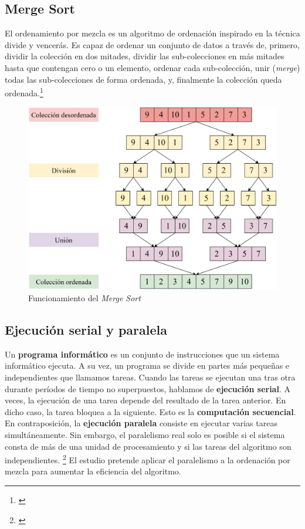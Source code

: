 \documentclass[titlepage]{article}
\begin{document}
\subsection{Merge Sort}
El ordenamiento por mezcla es un algoritmo de ordenación inspirado en la técnica divide y vencerás. Es capaz de ordenar un conjunto de datos a través de, primero, dividir la colección en dos mitades, dividir las sub-colecciones en más mitades hasta que contengan cero o un elemento, ordenar cada sub-colección, unir (\textit{merge}) todas las sub-colecciones de forma ordenada, y, finalmente la colección queda ordenada.\footnote{\cite{skiena-2008}}

\begin{figure}[h]
    \centering
    \includegraphics[width=0.50\linewidth]{Diagrames/arbolMS.png}
    \caption{Funcionamiento del \textit{Merge Sort}}
    \label{fig:arbolMS}
\end{figure}

\subsection{Ejecución serial y paralela}
Un \textbf{programa informático} es un conjunto de instrucciones que un sistema informático ejecuta. A su vez, un programa se divide en partes más pequeñas e independientes que llamamos tareas. Cuando las tareas se ejecutan una tras otra durante períodos de tiempo no superpuestos, hablamos de \textbf{ejecución serial}. A veces, la ejecución de una tarea depende del resultado de la tarea anterior. En dicho caso, la tarea bloquea a la siguiente. Esto es la \textbf{computación secuencial}. En contraposición, la \textbf{ejecución paralela} consiste en ejecutar varias tareas simultáneamente. Sin embargo, el paralelismo real solo es posible si el sistema consta de más de una unidad de procesamiento y si las tareas del algoritmo son independientes. \footnote{\cite{bobrov-2023}} El estudio pretende aplicar el paralelismo a la ordenación por mezcla para aumentar la eficiencia del algoritmo.
\end{document}

